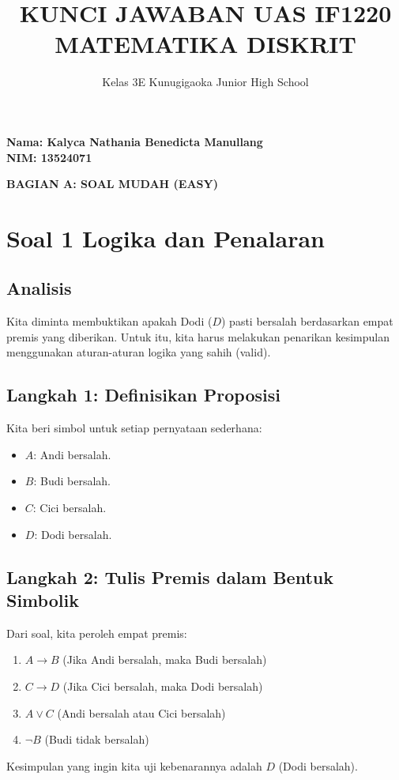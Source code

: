 \documentclass[12pt,a4paper]{article}
\title{KUNCI JAWABAN UAS IF1220 MATEMATIKA DISKRIT}
\author{Kelas 3E Kunugigaoka Junior High School}
\date{}
\begin{document}
\noindent \textbf{Nama: Kalyca Nathania Benedicta Manullang} \\
\noindent \textbf{NIM: 13524071}
\vspace{0.3cm}

\maketitle

\begin{center}
\Large \textbf{BAGIAN A: SOAL MUDAH (EASY)}
\end{center}

\section*{Soal 1 Logika dan Penalaran}
\subsection*{Analisis}
Kita diminta membuktikan apakah Dodi ($D$) pasti bersalah berdasarkan empat premis yang diberikan. Untuk itu, kita harus melakukan penarikan kesimpulan menggunakan aturan-aturan logika yang sahih (valid).

\subsection*{Langkah 1: Definisikan Proposisi}
Kita beri simbol untuk setiap pernyataan sederhana:
\begin{itemize}
    \item $A$: Andi bersalah.
    \item $B$: Budi bersalah.
    \item $C$: Cici bersalah.
    \item $D$: Dodi bersalah.
\end{itemize}

\subsection*{Langkah 2: Tulis Premis dalam Bentuk Simbolik}
Dari soal, kita peroleh empat premis:
\begin{enumerate}
    \item $A \rightarrow B$ \quad (Jika Andi bersalah, maka Budi bersalah)
    \item $C \rightarrow D$ \quad (Jika Cici bersalah, maka Dodi bersalah)
    \item $A \lor C$ \quad (Andi bersalah atau Cici bersalah)
    \item $\neg B$ \quad (Budi tidak bersalah)
\end{enumerate}
Kesimpulan yang ingin kita uji kebenarannya adalah $D$ (Dodi bersalah).
\end{document}
